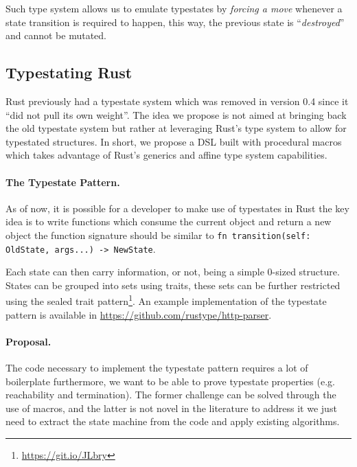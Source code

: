 \documentclass[a4paper, 10pt]{article}
\begin{document}
Such type system allows us to emulate typestates by \emph{forcing a move} whenever a state transition is required to happen,
this way, the previous state is “\emph{destroyed}” and cannot be mutated.

\subsection*{Typestating Rust}
Rust previously had a typestate system which was removed in version 0.4 since it “did not pull its own weight”.
The idea we propose is not aimed at bringing back the old typestate system but rather at leveraging Rust's type system to allow for typestated structures.
In short, we propose a DSL built with procedural macros which takes advantage of Rust's generics and affine type system capabilities.

\paragraph{The Typestate Pattern.}
As of now, it is possible for a developer to make use of typestates in Rust
the key idea is to write functions which consume the current object and return a new object
the function signature should be similar to \texttt{fn transition(self: OldState, args...) -> NewState}.

Each state can then carry information, or not, being a simple 0-sized structure.
States can be grouped into sets using traits,
these sets can be further restricted using the sealed trait pattern\footnote{\url{https://git.io/JLbry}}.
An example implementation of the typestate pattern is available in \url{https://github.com/rustype/http-parser}.


\paragraph{Proposal.}
The code necessary to implement the typestate pattern requires a lot of boilerplate furthermore,
we want to be able to prove typestate properties (e.g. reachability and termination).
The former challenge can be solved through the use of macros, and the latter is not novel in the literature
to address it we just need to extract the state machine from the code and apply existing algorithms.
\end{document}
